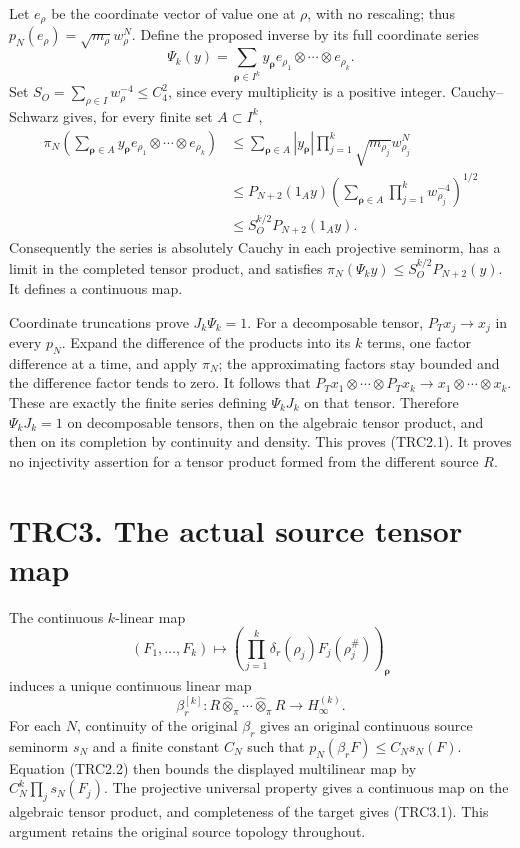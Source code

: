 Let \(e_\rho\) be the coordinate vector of value one at \(\rho\), with
no rescaling; thus \(p_N(e_\rho)=\sqrt{m_\rho}w_\rho^N\). Define the
proposed inverse by its full coordinate series \[
\Psi_k(y)=\sum_{\boldsymbol\rho\in I^k}
y_{\boldsymbol\rho}
e_{\rho_1}\otimes\cdots\otimes e_{\rho_k}.
\tag{TRC2.3}
\] Set \(S_O=\sum_{\rho\in I}w_\rho^{-4}\le C_4^2\), since every
multiplicity is a positive integer. Cauchy--Schwarz gives, for every
finite set \(A\subset I^k\), \[
\begin{aligned}
\pi_N\!\left(\sum_{\boldsymbol\rho\in A}
y_{\boldsymbol\rho}e_{\rho_1}\otimes\cdots\otimes e_{\rho_k}\right)
&\le\sum_{\boldsymbol\rho\in A}|y_{\boldsymbol\rho}|
\prod_{j=1}^k\sqrt{m_{\rho_j}}w_{\rho_j}^N\\
&\le P_{N+2}(1_Ay)
\left(\sum_{\boldsymbol\rho\in A}\prod_{j=1}^kw_{\rho_j}^{-4}\right)^{1/2}\\
&\le S_O^{k/2}P_{N+2}(1_Ay).
\end{aligned}
\tag{TRC2.4}
\] Consequently the series is absolutely Cauchy in each projective
seminorm, has a limit in the completed tensor product, and satisfies
\(\pi_N(\Psi_ky)\le S_O^{k/2}P_{N+2}(y)\). It defines a continuous map.

Coordinate truncations prove \(J_k\Psi_k=1\). For a decomposable tensor,
\(P_Tx_j\to x_j\) in every \(p_N\). Expand the difference of the
products into its \(k\) terms, one factor difference at a time, and
apply \(\pi_N\); the approximating factors stay bounded and the
difference factor tends to zero. It follows that
\(P_Tx_1\otimes\cdots\otimes P_Tx_k\to x_1\otimes\cdots\otimes x_k\).
These are exactly the finite series defining \(\Psi_kJ_k\) on that
tensor. Therefore \(\Psi_kJ_k=1\) on decomposable tensors, then on the
algebraic tensor product, and then on its completion by continuity and
density. This proves (TRC2.1). It proves no injectivity assertion for a
tensor product formed from the different source \(R\).

\section{TRC3. The actual source tensor
map}\label{trc3.-the-actual-source-tensor-map}

The continuous \(k\)-linear map \[
(F_1,\ldots,F_k)\longmapsto
\left(\prod_{j=1}^k\delta_r(\rho_j)F_j(\rho_j^\#)\right)_{\boldsymbol\rho}
\] induces a unique continuous linear map \[
\beta_r^{[k]}:R\widehat\otimes_\pi\cdots\widehat\otimes_\pi R
\longrightarrow H_\infty^{(k)}.
\tag{TRC3.1}
\] For each \(N\), continuity of the original \(\beta_r\) gives an
original continuous source seminorm \(s_N\) and a finite constant
\(C_N\) such that \(p_N(\beta_rF)\le C_Ns_N(F)\). Equation (TRC2.2) then
bounds the displayed multilinear map by \(C_N^k\prod_js_N(F_j)\). The
projective universal property gives a continuous map on the algebraic
tensor product, and completeness of the target gives (TRC3.1). This
argument retains the original source topology throughout.

